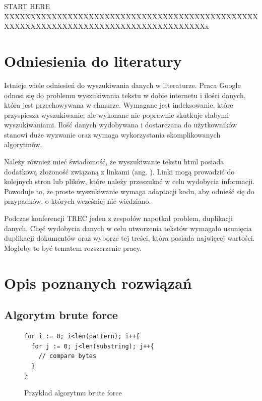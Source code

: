 START HERE XXXXXXXXXXXXXXXXXXXXXXXXXXXXXXXXXXXXXXXXXXXXXXXXXXXXXXXXXXXXXXXXXXXXXXXXXXXXXXXXXXXXXXx
\section{Odniesienia do literatury}

Istnieje wiele odniesień do wyszukiwania danych w literaturze. Praca Google 
\cite{bib:internet:htmlSearchGoogle} odnosi się do problemu wyszukiwania tekstu 
w dobie internetu i ilości danych, która jest przechowywana w chmurze. Wymagane
jest indeksowanie, które przyspiesza wyszukiwanie, ale wykonane nie poprawnie 
skutkuje słabymi wyszukiwaniami. Ilość danych wydobywana i dostarczana do
użytkowników stanowi duże wyzwanie oraz wymaga wykorzystania skomplikowanych 
algorytmów. 

Należy również mieć świadomość, że wyszukiwanie tekstu html posiada dodatkową 
złożoność związaną z linkami (ang. ). Linki mogą prowadzić do 
kolejnych stron lub plików, które należy przeszukać w celu wydobycia informacji.
Powoduje to, że proste wyszukiwanie wymaga adaptacji kodu, aby odnieść się do 
przypadków, o których wcześniej nie wiedziano.


Podczas konferencji TREC \cite{bib:konferencja:TRECDuplicates} jeden z zespołów 
napotkał problem, duplikacji danych. Chęć wydobycia danych w celu utworzenia
tekstów wymagało usunięcia duplikacji dokumentów oraz wyborze tej treści,
która posiada najwięcej wartości. Mogłoby to być tematem rozszerzenie pracy. 

\section{Opis poznanych rozwiązań}
\subsection{Algorytm brute force}

\begin{figure}[h]
  \centering
  \begin{lstlisting}
for i := 0; i<len(pattern); i++{
  for j := 0; j<len(substring); j++{
    // compare bytes
  }
}
  \end{lstlisting}
  \caption{Przykład algorytmu brute force}
  \label{fig:code:bruteForceComparison}
\end{figure}

